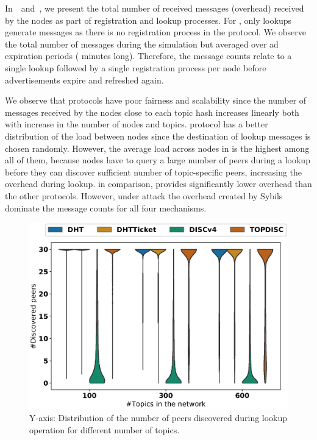 In~~and~, we present the total number of received messages (\ie overhead) received by the nodes as part of registration and lookup processes. For \discv, only lookups generate messages as there is no registration process in the protocol.
We observe the total number of messages during the simulation but averaged over ad expiration periods ( minutes long). Therefore, the message counts relate to a single lookup followed by a single registration process per node before advertisements expire and refreshed again.

We observe that \altname protocols have poor fairness and scalability since the number of messages received by the nodes close to each topic hash increases linearly both with increase in the number of nodes and topics. 
\discv protocol has a better distribution of the load between nodes since the destination of lookup messages is chosen randomly. However, the average load across nodes in \discv is the highest among all of them, because nodes have to query a large number of peers during a lookup before they can discover sufficient number of topic-specific peers, increasing the overhead during lookup.
\sysname in comparison, provides significantly lower overhead than the other protocols. However, under attack the overhead created by Sybils dominate the message counts for all four mechanisms. %


\begin{figure}[!h]
\includegraphics[width=\linewidth]{results/no_split/violin_topic_discovered.eps}
\caption{Y-axis: Distribution of the number of peers discovered during lookup operation for different number of topics.}
\label{fig:discoveredPerTopic}
\end{figure}

